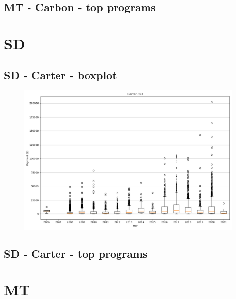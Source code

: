 \subsection*{MT - Carbon - top programs}

\newpage
\section*{SD}
\subsection*{SD - Carter - boxplot}
\begin{figure}[h]
\centering
\includegraphics[width=7in]{../output/boxplots/counties/Carter-SD_boxplot.png}
\end{figure}


\subsection*{SD - Carter - top programs}

\newpage
\section*{MT}
